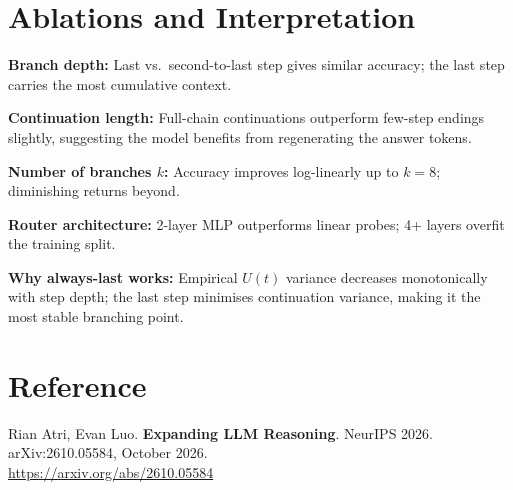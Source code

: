 \documentclass[10pt,twocolumn]{article}
\begin{document}
\section{Ablations and Interpretation}

\textbf{Branch depth:} Last vs.\ second-to-last step gives similar accuracy;
the last step carries the most cumulative context.

\textbf{Continuation length:} Full-chain continuations outperform few-step
endings slightly, suggesting the model benefits from regenerating the answer tokens.

\textbf{Number of branches $k$:} Accuracy improves log-linearly up to $k{=}8$;
diminishing returns beyond.

\textbf{Router architecture:} 2-layer MLP outperforms linear probes; 4+ layers
overfit the training split.

\textbf{Why always-last works:} Empirical $U(t)$ variance decreases monotonically
with step depth; the last step minimises continuation variance, making it the
most stable branching point.

\section*{Reference}

Rian Atri, Evan Luo.
\textbf{Expanding LLM Reasoning}.
NeurIPS 2026. arXiv:2610.05584, October 2026.\\
\url{https://arxiv.org/abs/2610.05584}
\end{document}
